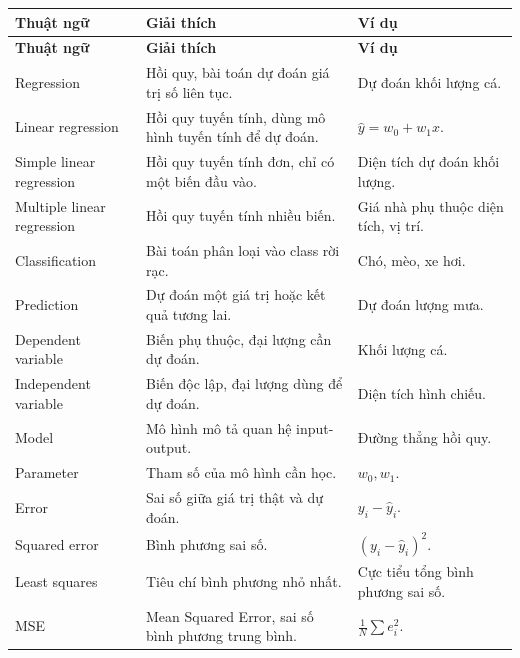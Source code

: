 \small
\begin{longtable}{p{}p{}p{}}
\toprule
\textbf{Thuật ngữ} & \textbf{Giải thích} & \textbf{Ví dụ} \\
\midrule
\endfirsthead

\toprule
\textbf{Thuật ngữ} & \textbf{Giải thích} & \textbf{Ví dụ} \\
\midrule
\endhead

Regression & Hồi quy, bài toán dự đoán giá trị số liên tục. & Dự đoán khối lượng cá. \\

Linear regression & Hồi quy tuyến tính, dùng mô hình tuyến tính để dự đoán. & $\hat{y}=w_0+w_1x$. \\

Simple linear regression & Hồi quy tuyến tính đơn, chỉ có một biến đầu vào. & Diện tích dự đoán khối lượng. \\

Multiple linear regression & Hồi quy tuyến tính nhiều biến. & Giá nhà phụ thuộc diện tích, vị trí. \\

Classification & Bài toán phân loại vào class rời rạc. & Chó, mèo, xe hơi. \\

Prediction & Dự đoán một giá trị hoặc kết quả tương lai. & Dự đoán lượng mưa. \\

Dependent variable & Biến phụ thuộc, đại lượng cần dự đoán. & Khối lượng cá. \\

Independent variable & Biến độc lập, đại lượng dùng để dự đoán. & Diện tích hình chiếu. \\

Model & Mô hình mô tả quan hệ input-output. & Đường thẳng hồi quy. \\

Parameter & Tham số của mô hình cần học. & $w_0,w_1$. \\

Error & Sai số giữa giá trị thật và dự đoán. & $y_i-\hat{y}_i$. \\

Squared error & Bình phương sai số. & $(y_i-\hat{y}_i)^2$. \\

Least squares & Tiêu chí bình phương nhỏ nhất. & Cực tiểu tổng bình phương sai số. \\

MSE & Mean Squared Error, sai số bình phương trung bình. & $\frac{1}{N}\sum e_i^2$. \\


\end{longtable}
